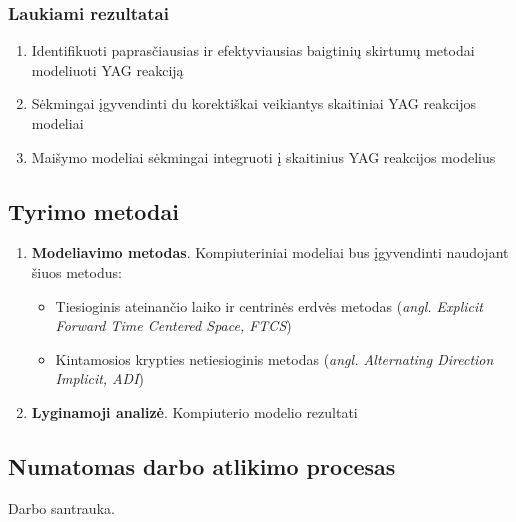 \documentclass[]{VUMIFTemplateClass}
\begin{document}
\subsubsection{Laukiami rezultatai}
\begin{enumerate}
    \item Identifikuoti paprasčiausias ir efektyviausias baigtinių skirtumų metodai modeliuoti YAG reakciją

    \item Sėkmingai įgyvendinti du korektiškai veikiantys skaitiniai YAG reakcijos modeliai

    \item Maišymo modeliai sėkmingai integruoti į skaitinius YAG reakcijos modelius

\end{enumerate}

\newpage

\subsection{Tyrimo metodai}

\begin{enumerate}
    \item \textbf{Modeliavimo metodas}. Kompiuteriniai modeliai bus įgyvendinti naudojant šiuos metodus:
    \begin{itemize}
        \item Tiesioginis ateinančio laiko ir centrinės erdvės metodas (\textit{angl. Explicit Forward Time Centered Space, FTCS})
        \item Kintamosios krypties netiesioginis metodas (\textit{angl. Alternating Direction Implicit, ADI})
    \end{itemize}
    \item \textbf{Lyginamoji analizė}. Kompiuterio modelio rezultati
\end{enumerate}


\subsection{Numatomas darbo atlikimo procesas}


Darbo santrauka.\\
\end{document}
